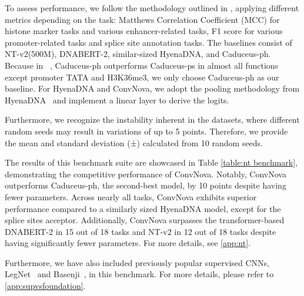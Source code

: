 To assess performance, we follow the methodology outlined in \citep{nguyen2024hyenadna}, applying different metrics depending on the task: Matthews Correlation Coefficient (MCC) for histone marker tasks and various enhancer-related tasks, F1 score for various promoter-related tasks and splice site annotation tasks. The baselines consist of NT-v2(500M), DNABERT-2, similar-sized HyenaDNA, and Caduceus-ph. Because in ~\citep{schiff2024caduceus}, Caduceus-ph outperforms Caduceus-ps in almost all functions except promoter TATA and H3K36me3, we only choose Caduceus-ph as our baseline. For HyenaDNA and ConvNova, we adopt the pooling methodology from HyenaDNA~\citep{nguyen2024hyenadna} and implement a linear layer to derive the logits.

Furthermore, we recognize the instability inherent in the datasets, where different random seeds may result in variations of up to 5 points. Therefore, we provide the mean and standard deviation (±) calculated from 10 random seeds.

The results of this benchmark suite are showcased in Table \ref{table:nt benchmark}, demonstrating the competitive performance of ConvNova. Notably, ConvNova outperforms Caduceus-ph, the second-best model, by 10 points despite having fewer parameters. Across nearly all tasks, ConvNova exhibits superior performance compared to a similarly sized HyenaDNA model, except for the splice sites acceptor. Additionally, ConvNova surpasses the transformer-based DNABERT-2 in 15 out of 18 tasks and NT-v2 in 12 out of 18 tasks despite having significantly fewer parameters. For more details, see \ref{app:nt}. 


Furthermore, we have also included previously popular supervised CNNs, LegNet~\citep{penzar2023legnet} and Basenji~\citep{kelley2018sequential}, in this benchmark. For more details, please refer to \ref{app:supvsfoundation}.






